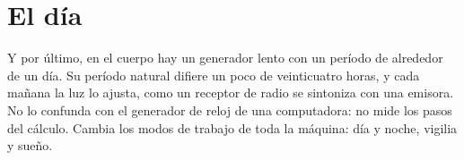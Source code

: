 \section*{El día}

Y por último, en el cuerpo hay un generador lento con un período de alrededor de un día. Su período natural difiere un poco de veinticuatro horas, y cada mañana la luz lo ajusta, como un receptor de radio se sintoniza con una emisora. No lo confunda con el generador de reloj de una computadora: no mide los pasos del cálculo. Cambia los modos de trabajo de toda la máquina: día y noche, vigilia y sueño.

